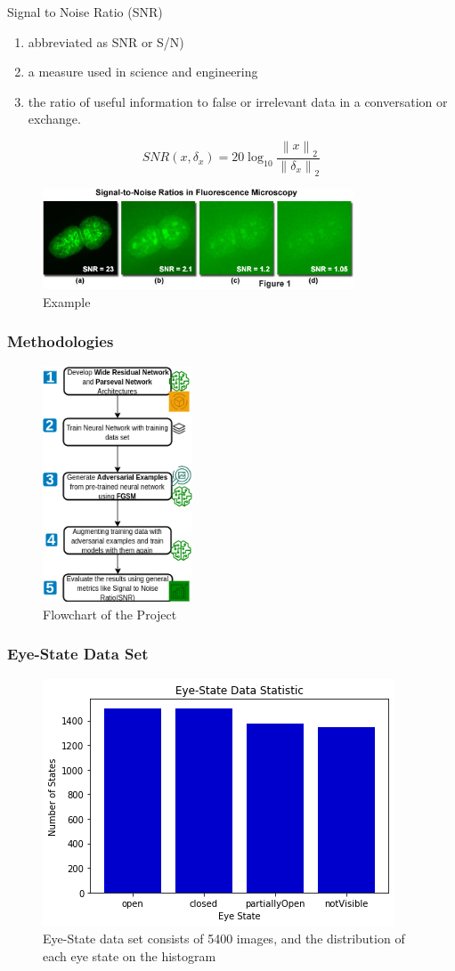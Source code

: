 \documentclass{beamer}		%
\begin{document}
\begin{frame}{Signal to Noise Ratio (SNR)}	
\begin{enumerate}
    \item abbreviated as SNR or S/N)
    \item a measure used in science and engineering 
    \item the ratio of useful information to false or irrelevant data in a conversation or exchange.
\end{enumerate}
 \[
SNR(x,\delta _{x}) = 20\log_{10}\frac{\left \| x \right \|_{2}}{\left \| \delta _{x} \right \|_{2}}
\]
\begin{figure}
    \centering
    \includegraphics[height = 3cm]{signaltonoise.jpg}
    \caption{Example}
    \label{fig:my_label}
\end{figure}
\end{frame}	
\begin{frame}
\frametitle{Methodologies}
\begin{figure}	%
\includegraphics[height=7cm]{Model-Page-2.png}
\caption{Flowchart of the Project}
\end{figure}
\end{frame}	
\begin{frame}
\frametitle{Eye-State Data Set}
\begin{figure}
    \centering
    \includegraphics[height=4 cm]{data_histogram.png}
    \caption{Eye-State data set consists of 5400 images, and the distribution of each eye state on the histogram }
\end{figure}
\end{frame}
\end{document}
